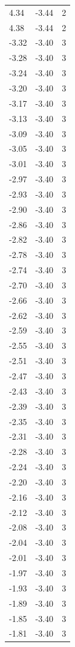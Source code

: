 \begin{longtable}{lrr}
  4.34 & -3.44 & 2 \\
  4.38 & -3.44 & 2 \\
  -3.32 & -3.40 & 3 \\
  -3.28 & -3.40 & 3 \\
  -3.24 & -3.40 & 3 \\
  -3.20 & -3.40 & 3 \\
  -3.17 & -3.40 & 3 \\
  -3.13 & -3.40 & 3 \\
  -3.09 & -3.40 & 3 \\
  -3.05 & -3.40 & 3 \\
  -3.01 & -3.40 & 3 \\
  -2.97 & -3.40 & 3 \\
  -2.93 & -3.40 & 3 \\
  -2.90 & -3.40 & 3 \\
  -2.86 & -3.40 & 3 \\
  -2.82 & -3.40 & 3 \\
  -2.78 & -3.40 & 3 \\
  -2.74 & -3.40 & 3 \\
  -2.70 & -3.40 & 3 \\
  -2.66 & -3.40 & 3 \\
  -2.62 & -3.40 & 3 \\
  -2.59 & -3.40 & 3 \\
  -2.55 & -3.40 & 3 \\
  -2.51 & -3.40 & 3 \\
  -2.47 & -3.40 & 3 \\
  -2.43 & -3.40 & 3 \\
  -2.39 & -3.40 & 3 \\
  -2.35 & -3.40 & 3 \\
  -2.31 & -3.40 & 3 \\
  -2.28 & -3.40 & 3 \\
  -2.24 & -3.40 & 3 \\
  -2.20 & -3.40 & 3 \\
  -2.16 & -3.40 & 3 \\
  -2.12 & -3.40 & 3 \\
  -2.08 & -3.40 & 3 \\
  -2.04 & -3.40 & 3 \\
  -2.01 & -3.40 & 3 \\
  -1.97 & -3.40 & 3 \\
  -1.93 & -3.40 & 3 \\
  -1.89 & -3.40 & 3 \\
  -1.85 & -3.40 & 3 \\
  -1.81 & -3.40 & 3 \\

\end{longtable}
